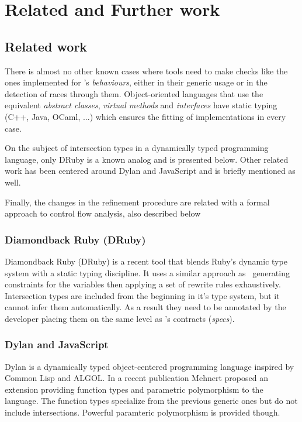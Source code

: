 \chapter{Related and Further work}

\section{Related work}
\label{sct:related_work}

There is almost no other known cases where tools need to make checks
like the ones implemented for \er's \emph{behaviours}, either in their
generic usage or in the detection of races through
them. Object-oriented languages that use the equivalent \emph{abstract
  classes}, \emph{virtual methods} and \emph{interfaces} have static
typing (C++, Java, OCaml, ...) which ensures the fitting of
implementations in every case.

On the subject of intersection types in a dynamically typed
programming language, only DRuby is a known analog and is presented
below. Other related work has been centered around Dylan and
JavaScript and is briefly mentioned as well.

Finally, the changes in the refinement procedure are related with a
formal approach to control flow analysis, also described below

\subsection{Diamondback Ruby (DRuby)}

Diamondback Ruby (DRuby)\cite{druby} is a recent tool that blends
Ruby's dynamic type system with a static typing discipline. It uses a
similar approach as \dr\ generating constraints for the variables then
applying a set of rewrite rules exhaustively. Intersection types are
included from the beginning in it's type system, but it cannot infer
them automatically. As a result they need to be annotated by the
developer placing them on the same level as \dr's contracts
(\emph{specs}).

\subsection{Dylan and JavaScript}

Dylan is a dynamically typed object-centered programming language
inspired by Common Lisp and ALGOL. In a recent publication Mehnert
proposed an extension providing function types and parametric
polymorphism to the language\cite{dylan}. The function types
specialize from the previous generic ones but do not include
intersections. Powerful paramteric polymorphism is provided though.

